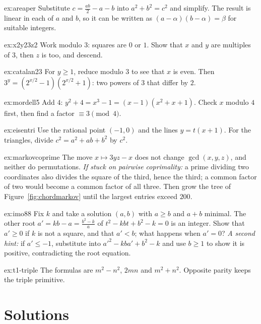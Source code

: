 \begin{hint}{ex:areaper}
Substitute $c=\frac{ab}2-a-b$ into $a^2+b^2=c^2$ and simplify. The result is linear in each of $a$ and $b$, so it can be written as $(a-\alpha)(b-\alpha)=\beta$ for suitable integers.
\end{hint}
\begin{hint}{ex:x2y23z2}
Work modulo $3$: squares are $0$ or $1$. Show that $x$ and $y$ are multiples of $3$, then $z$ is too, and descend.
\end{hint}
\begin{hint}{ex:catalan23}
For $y\ge1$, reduce modulo $3$ to see that $x$ is even. Then $3^y=(2^{x/2}-1)(2^{x/2}+1)$: two powers of $3$ that differ by $2$.
\end{hint}
\begin{hint}{ex:mordell5}
Add $4$: $y^2+4=x^3-1=(x-1)(x^2+x+1)$. Check $x$ modulo $4$ first, then find a factor $\equiv3\pmod4$.
\end{hint}
\begin{hint}{ex:eisentri}
Use the rational point $(-1,0)$ and the lines $y=t(x+1)$. For the triangles, divide $c^2=a^2+ab+b^2$ by $c^2$.
\end{hint}
\begin{hint}{ex:markovcoprime}
The move $x\mapsto3yz-x$ does not change $\gcd(x,y,z)$, and neither do permutations. \emph{If stuck on pairwise coprimality:} a prime dividing two coordinates also divides the square of the third, hence the third; a common factor of two would become a common factor of all three. Then grow the tree of Figure~\ref{fig:chordmarkov} until the largest entries exceed $200$.
\end{hint}
\begin{hint}{ex:imo88}
Fix $k$ and take a solution $(a,b)$ with $a\ge b$ and $a+b$ minimal. The other root $a'=kb-a=\frac{b^2-k}a$ of $t^2-kbt+b^2-k=0$ is an integer. Show that $a'\ge0$ if $k$ is not a square, and that $a'<b$; what happens when $a'=0$? \emph{A second hint:} if $a'\le-1$, substitute into $a'^2-kba'+b^2-k$ and use $b\ge1$ to show it is positive, contradicting the root equation.
\end{hint}

\begin{hint}{ex:t1-triple}
The formulas are $m^2-n^2$, $2mn$ and $m^2+n^2$. Opposite parity keeps the triple primitive.
\end{hint}

\section{Solutions}

